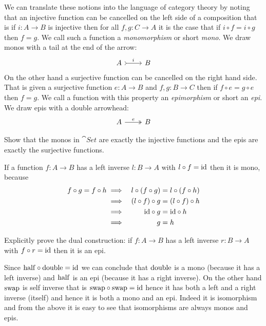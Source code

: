 We can translate these notions into the language of category theory by noting that an injective function can be cancelled on the left side of a composition that is if $i : A \to B$ is injective then for all $f,g : C \to A$ it is the case  that if $i \circ f = i \circ g$ then $f = g$. We call such a function a \emph{monomorphism} or short \emph{mono}. We draw monos with a tail at the end of the arrow:
\[\begin{tikzcd}
A \arrow[r,rightarrowtail,"i"]  & B
\end{tikzcd} 
\]
On the other hand a surjective function can be cancelled on the right hand side. That is given a surjective function $e : A \to B$ and $f,g : B \to C$ then if $f \circ e = g \circ e$ then $f = g$. We call a function with this property an\emph{ epimorphism} or short an \emph{epi}. We draw epis with a double arrowhead:
\[\begin{tikzcd}
A \arrow[r,twoheadrightarrow,"e"]  & B
\end{tikzcd}
\]
\begin{Exercise}
  Show that the monos in $\cat{Set}$ are exactly the injective functions and the epis are exactly the surjective functions.
\end{Exercise}
If a function $f : A \to B$ has a left inverse $l : B \to A$ with $l \circ f = \mathrm{id}$ then it is mono, because  
\begin{align*}
f \circ g = f \circ h 
& \implies & l \circ (f \circ g) & = l \circ (f \circ h) \\
& \implies & (l \circ f) \circ g& = (l \circ f) \circ h \\
& \implies &\mathrm{id} \circ g & = \mathrm{id} \circ h \\
& \implies & g & = h 
\end{align*}
\begin{Exercise}
  Explicitly prove the dual construction: if $f : A \to B$ has a left inverse $r : B \to A$ with $f \circ r = \mathrm{id}$ then it is an epi.
\end{Exercise}
Since $\mathrm{half} \circ \mathrm{double} = \mathrm{id}$ we can conclude that $\mathrm{double}$ is a mono (because it has a left inverse) and $\mathrm{half}$ is an epi (because it has a right inverse). On the other hand $\mathrm{swap}$ is self inverse that is $\mathrm{swap} \circ \mathrm{swap} = \mathrm{id}$ hence it has both a left and a right inverse (itself) and hence it is both a mono and an epi. 
 Indeed it is isomorphism and from the above it is easy to see that isomorphisms are always monos and epis. 

